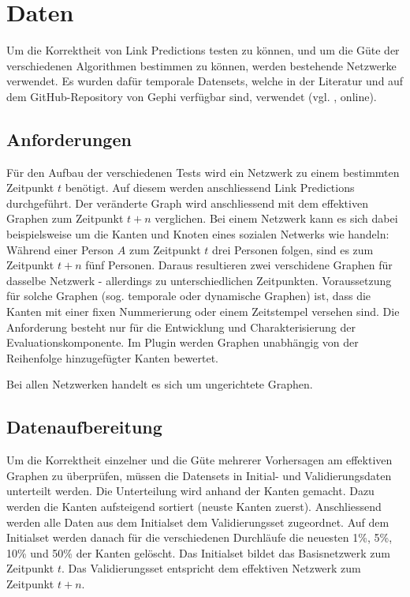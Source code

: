\chapter{Daten}
\label{daten}
Um die Korrektheit von Link Predictions testen zu können, und um die Güte der verschiedenen Algorithmen bestimmen zu können, werden bestehende Netzwerke verwendet.
Es wurden dafür temporale Datensets, welche in der Literatur und auf dem GitHub-Repository von Gephi verfügbar sind, verwendet (vgl. \citeauthor{moll_datasets_2018} \citeyear{moll_datasets_2018}, online).

\section{Anforderungen}
Für den Aufbau der verschiedenen Tests wird ein Netzwerk zu einem bestimmten Zeitpunkt $t$ benötigt.
Auf diesem werden anschliessend Link Predictions durchgeführt.
Der veränderte Graph wird anschliessend mit dem effektiven Graphen zum Zeitpunkt $t + n$ verglichen.
Bei einem Netzwerk kann es sich dabei beispielsweise um die Kanten und Knoten eines sozialen Netwerks wie  handeln:
Während einer Person $A$ zum Zeitpunkt $t$ drei Personen folgen, sind es zum Zeitpunkt $t + n$ fünf Personen.
Daraus resultieren zwei verschidene Graphen für dasselbe Netzwerk - allerdings zu unterschiedlichen Zeitpunkten.
Voraussetzung für solche Graphen (sog. temporale oder dynamische Graphen) ist, dass die Kanten mit einer fixen Nummerierung oder einem Zeitstempel versehen sind.
Die Anforderung besteht nur für die Entwicklung und Charakterisierung der Evaluationskomponente.
Im Plugin werden Graphen unabhängig von der Reihenfolge hinzugefügter Kanten bewertet.

Bei allen Netzwerken handelt es sich um ungerichtete Graphen.

\section{Datenaufbereitung}
Um die Korrektheit einzelner und die Güte mehrerer Vorhersagen am effektiven Graphen zu überprüfen, müssen die Datensets in Initial- und Validierungsdaten unterteilt werden.
Die Unterteilung wird anhand der Kanten gemacht. Dazu werden die Kanten aufsteigend sortiert (neuste Kanten zuerst).
Anschliessend werden alle Daten aus dem Initialset dem Validierungsset zugeordnet. Auf dem Initialset werden danach für die verschiedenen Durchläufe die neuesten 1\%, 5\%, 10\% und 50\% der Kanten gelöscht. Das Initialset bildet das Basisnetzwerk zum Zeitpunkt $t$.
Das Validierungsset entspricht dem effektiven Netzwerk zum Zeitpunkt $t + n$.

